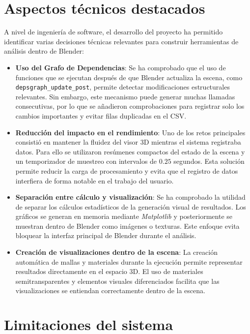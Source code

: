 \section{Aspectos técnicos destacados}

A nivel de ingeniería de software, el desarrollo del proyecto ha permitido identificar varias decisiones técnicas relevantes para construir herramientas de análisis dentro de Blender:

\begin{itemize}
    \item \textbf{Uso del Grafo de Dependencias}: Se ha comprobado que el uso de funciones que se ejecutan después de que Blender actualiza la escena, como \texttt{depsgraph\_update\_post}, permite detectar modificaciones estructurales relevantes. Sin embargo, este mecanismo puede generar muchas llamadas consecutivas, por lo que se añadieron comprobaciones para registrar solo los cambios importantes y evitar filas duplicadas en el CSV.

    \item \textbf{Reducción del impacto en el rendimiento}: Uno de los retos principales consistió en mantener la fluidez del visor 3D mientras el sistema registraba datos. Para ello se utilizaron resúmenes compactos del estado de la escena y un temporizador de muestreo con intervalos de $0.25$ segundos. Esta solución permite reducir la carga de procesamiento y evita que el registro de datos interfiera de forma notable en el trabajo del usuario.

    \item \textbf{Separación entre cálculo y visualización}: Se ha comprobado la utilidad de separar los cálculos estadísticos de la generación visual de resultados. Los gráficos se generan en memoria mediante \textit{Matplotlib} y posteriormente se muestran dentro de Blender como imágenes o texturas. Este enfoque evita bloquear la interfaz principal de Blender durante el análisis.

    \item \textbf{Creación de visualizaciones dentro de la escena}: La creación automática de mallas y materiales durante la ejecución permite representar resultados directamente en el espacio 3D. El uso de materiales semitransparentes y elementos visuales diferenciados facilita que las visualizaciones se entiendan correctamente dentro de la escena.
\end{itemize}

\section{Limitaciones del sistema}

